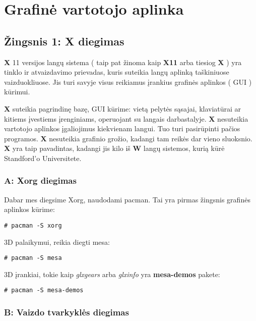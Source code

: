 \chapter{Grafinė vartotojo aplinka}

  \section{Žingsnis 1: X diegimas}

    \textbf{X} 11 versijos langų sistema ( taip pat žinoma kaip
    \textbf{X11} arba tiesiog \textbf{X} ) yra tinklo ir atvaizdavimo
    prievadas, kuris suteikia langų aplinką taškiniuose
    vaizduokliuose. Jis turi savyje visus reikiamus įrankius grafinės
    aplinkos ( GUI ) kūrimui.

    \textbf{X} suteikia pagrindinę bazę, GUI kūrime: vietą pelytės
    sąsajai, klaviatūrai ar kitiems įvestiems įrenginiams, operuojant
    su langais darbastalyje. \textbf{X} nesuteikia vartotojo aplinkos
    įgaliojimus kiekvienam langui. Tuo turi pasirūpinti pačios
    programos. \textbf{X} nesuteikia grafinio grožio, kadangi tam
    reikės dar vieno sluoksnio. \textbf{X} yra taip pavadintas,
    kadangi jis kilo iš \textbf{W} langų sistemos, kurią kūrė
    Standford'o Universitete.

    \subsection{A: Xorg diegimas}

      Dabar mes diegsime Xorg, naudodami pacman. Tai yra pirmas
      žingsnis grafinės aplinkos kūrime:

      \begin{verbatim}
# pacman -S xorg
      \end{verbatim}

      3D palaikymui, reikia diegti mesa:

      \begin{verbatim}
# pacman -S mesa
      \end{verbatim}

      3D įrankiai, tokie kaip \textsl{glxgears} arba \textsl{glxinfo}
      yra \textbf{mesa-demos} pakete:

      \begin{verbatim}
# pacman -S mesa-demos
      \end{verbatim}

    \subsection{B: Vaizdo tvarkyklės diegimas}

